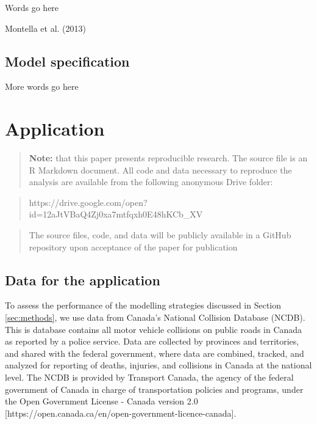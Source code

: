 \documentclass[]{elsarticle} %
\begin{document}
Words go here

Montella et al. (2013)

\hypertarget{model-specification}{%
\subsection{Model specification}\label{model-specification}}

More words go here

\hypertarget{sec:application}{%
\section{Application}\label{sec:application}}

\begin{quote}
\textbf{Note:} that this paper presents reproducible research. The
source file is an R Markdown document. All code and data necessary to
reproduce the analysis are available from the following anonymous Drive
folder:
\end{quote}

\begin{quote}
https://drive.google.com/open?id=12aJtVBaQ4Zj0xa7mtfqxh0E48hKCb\_XV
\end{quote}

\begin{quote}
The source files, code, and data will be publicly available in a GitHub
repository upon acceptance of the paper for publication
\end{quote}

\hypertarget{data-for-the-application}{%
\subsection{Data for the application}\label{data-for-the-application}}

To assess the performance of the modelling strategies discussed in
Section \ref{sec:methods}, we use data from Canada's National Collision
Database (NCDB). This is database contains all motor vehicle collisions
on public roads in Canada as reported by a police service. Data are
collected by provinces and territories, and shared with the federal
government, where data are combined, tracked, and analyzed for reporting
of deaths, injuries, and collisions in Canada at the national level. The
NCDB is provided by Transport Canada, the agency of the federal
government of Canada in charge of transportation policies and programs,
under the Open Government License - Canada version 2.0
{[}https://open.canada.ca/en/open-government-licence-canada{]}.
\end{document}
